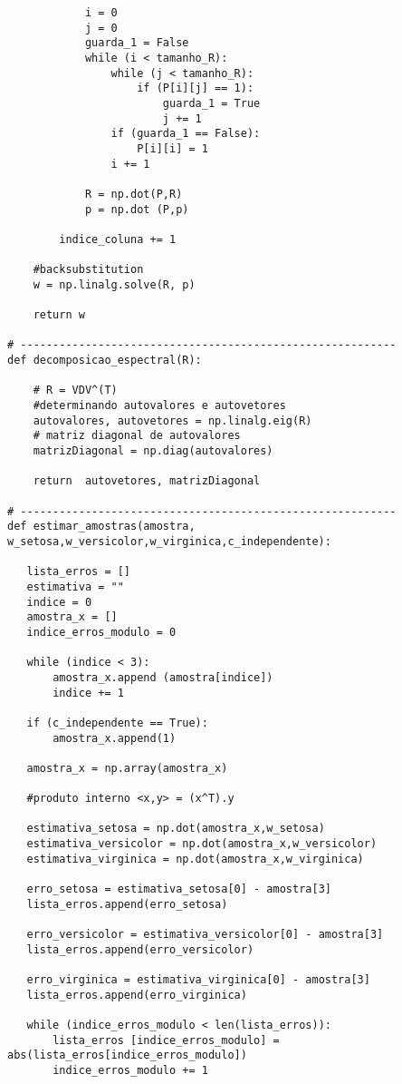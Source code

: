 \documentclass[a4paper,12pt,twoside]{article}
\begin{document}
\begin{lstlisting}
            i = 0
            j = 0
            guarda_1 = False
            while (i < tamanho_R):
                while (j < tamanho_R):
                    if (P[i][j] == 1):
                        guarda_1 = True
                        j += 1
                if (guarda_1 == False):
                    P[i][i] = 1
                i += 1
            
            R = np.dot(P,R)
            p = np.dot (P,p)
       
        indice_coluna += 1 
    
    #backsubstitution
    w = np.linalg.solve(R, p)
      
    return w
           
# ----------------------------------------------------------
def decomposicao_espectral(R):
    
    # R = VDV^(T)
    #determinando autovalores e autovetores
    autovalores, autovetores = np.linalg.eig(R) 
    # matriz diagonal de autovalores
    matrizDiagonal = np.diag(autovalores) 
      
    return  autovetores, matrizDiagonal

# ----------------------------------------------------------
def estimar_amostras(amostra, w_setosa,w_versicolor,w_virginica,c_independente):
    
   lista_erros = []
   estimativa = ""
   indice = 0
   amostra_x = []
   indice_erros_modulo = 0
   
   while (indice < 3):
       amostra_x.append (amostra[indice])
       indice += 1
       
   if (c_independente == True):
       amostra_x.append(1)
      
   amostra_x = np.array(amostra_x)
   
   #produto interno <x,y> = (x^T).y
   
   estimativa_setosa = np.dot(amostra_x,w_setosa)
   estimativa_versicolor = np.dot(amostra_x,w_versicolor)
   estimativa_virginica = np.dot(amostra_x,w_virginica)
   
   erro_setosa = estimativa_setosa[0] - amostra[3]
   lista_erros.append(erro_setosa)
   
   erro_versicolor = estimativa_versicolor[0] - amostra[3]
   lista_erros.append(erro_versicolor)
   
   erro_virginica = estimativa_virginica[0] - amostra[3]
   lista_erros.append(erro_virginica)
   
   while (indice_erros_modulo < len(lista_erros)):
       lista_erros [indice_erros_modulo] = abs(lista_erros[indice_erros_modulo])
       indice_erros_modulo += 1
   

\end{lstlisting}
\end{document}
